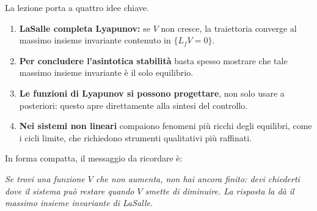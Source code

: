 La lezione porta a quattro idee chiave.

\begin{enumerate}
    \item \textbf{LaSalle completa Lyapunov:} se \(V\) non cresce, la traiettoria converge al massimo insieme invariante contenuto in \(\{L_fV=0\}\).
    \item \textbf{Per concludere l'asintotica stabilità} basta spesso mostrare che tale massimo insieme invariante è il solo equilibrio.
    \item \textbf{Le funzioni di Lyapunov si possono progettare}, non solo usare a posteriori: questo apre direttamente alla sintesi del controllo.
    \item \textbf{Nei sistemi non lineari} compaiono fenomeni più ricchi degli equilibri, come i cicli limite, che richiedono strumenti qualitativi più raffinati.
\end{enumerate}

\medskip

\noindent
In forma compatta, il messaggio da ricordare è:

\begin{center}
\emph{Se trovi una funzione \(V\) che non aumenta, non hai ancora finito: devi chiederti dove il sistema può restare quando \(V\) smette di diminuire. La risposta la dà il massimo insieme invariante di LaSalle.}
\end{center}